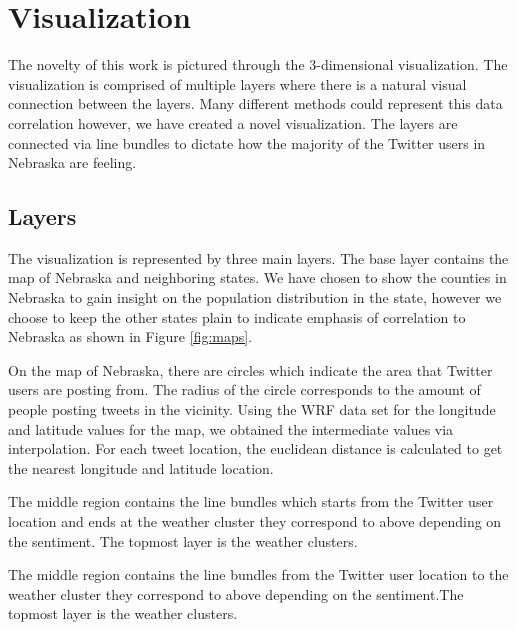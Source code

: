 \documentclass[journal]{vgtc}                %
\begin{document}
\section{Visualization}
The novelty of this work is pictured through the 3-dimensional visualization. The visualization is comprised of multiple layers where there is a natural visual connection between the layers. Many different methods could represent this data correlation however, we have created a novel visualization. The layers are connected via line bundles to dictate how the majority of the Twitter users in Nebraska are feeling.

\subsection{Layers}
The visualization is represented by three main layers. The base layer contains the map of Nebraska and neighboring states. We have chosen to show the counties in Nebraska to gain insight on the population distribution in the state, however we choose to keep the other states plain to indicate emphasis of correlation to Nebraska as shown in Figure \ref{fig:maps}.

On the map of Nebraska, there are circles which indicate the area that Twitter users are posting from. The radius of the circle corresponds to the amount of people posting tweets in the vicinity. Using the WRF data set for the longitude and latitude values for the map, we obtained the intermediate values via interpolation. For each tweet location, the euclidean distance is calculated to get the nearest longitude and latitude location.

The middle region contains the line bundles which starts from the Twitter user location and ends at the weather cluster they correspond to above depending on the sentiment. The topmost layer is the weather clusters.

The middle region contains the line bundles from the Twitter user location to the weather cluster they correspond to above depending on the sentiment.The topmost layer is the weather clusters.
\end{document}
